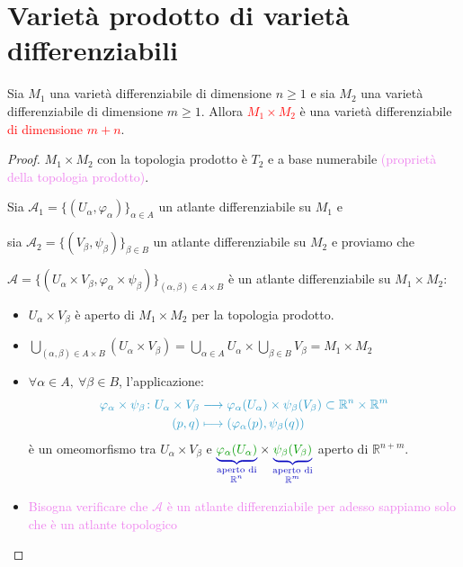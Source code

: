     \section{Varietà prodotto di varietà differenziabili}

        \begin{proposizione}
        \label{prop:Varieta_prodotto}
        \mbox{}

        Sia $M_1$ una varietà differenziabile di dimensione $n \ge 1$ e sia $M_2$ una varietà differenziabile di dimensione $m \ge 1$.
         Allora \textcolor{red}{$M_1 \times M_2$} è una varietà differenziabile \textcolor{red}{di dimensione $m + n$}.
        \end{proposizione}

        \begin{proof}
        \mbox{}
        
        $M_1 \times M_2$ con la topologia prodotto è $T_2$ e a base numerabile \textcolor{violet}{(proprietà della topologia prodotto)}.

        Sia $\mathcal{A}_1 = \{(U_\alpha, \varphi_\alpha)\}_{\alpha \in A}$ un atlante differenziabile su $M_1$ e
        
        sia $\mathcal{A}_2 = \{(V_\beta, \psi_\beta)\}_{\beta \in B}$ un
        atlante differenziabile su $M_2$ e proviamo che 
        
        $\mathcal{A} = \{(U_\alpha \times V_\beta, \varphi_\alpha \times \psi_\beta)\}_{(\alpha, \beta) \in A \times B} $
        è un atlante differenziabile su $M_1 \times M_2$:
        \begin{itemize}
            \item $U_\alpha \times V_\beta$ è aperto di $M_1 \times M_2$ per la topologia prodotto.
            \item $\displaystyle \bigcup_{(\alpha, \beta) \in A \times B} (U_\alpha \times V_\beta) = \bigcup_{\alpha \in A} U_\alpha \times \bigcup_{\beta \in B} V_\beta = M_1 \times M_2$
            \item $\forall \alpha \in A, \ \forall \beta \in B$, l'applicazione:
            \[ \color{celeste}
            \begin{aligned}
            \varphi_\alpha \times \psi_\beta \colon U_\alpha \times V_\beta &\longrightarrow \varphi_\alpha(U_\alpha) \times \psi_\beta(V_\beta) \subset \mathbb{R}^n \times \mathbb{R}^m \\
            (p, q) &\longmapsto (\varphi_\alpha(p), \psi_\beta(q))
            \end{aligned}
            \]
            è un \textcolor{celeste}{omeomorfismo} tra $U_\alpha \times V_\beta$ e $\textcolor{blu}{\underbrace{\textcolor{verde}{\varphi_\alpha(U_\alpha)}}_{\substack{\text{aperto di} \\ \mathbb{R}^n}}} \times \textcolor{blu}{\underbrace{\textcolor{verde}{\psi_\beta(V_\beta)}}_{\substack{\text{aperto di} \\ \mathbb{R}^m}}}$ aperto di $\mathbb{R}^{n+m}$.
            \item \textcolor{violet}{Bisogna verificare che $\mathcal{A}$ è un atlante differenziabile per adesso sappiamo solo che è un atlante topologico}
            

\end{itemize}
\end{proof}
